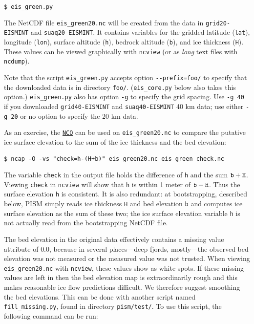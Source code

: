 \documentclass[11pt,final]{amsart}
\begin{document}
\verb|$ eis_green.py|

The NetCDF file \verb|eis_green20.nc| will be created from the data in \verb|grid20-EISMINT| and \verb|suaq20-EISMINT|.  It contains variables for the gridded latitude (\verb|lat|), longitude (\verb|lon|), surface altitude (\verb|h|), bedrock altitude (\verb|b|), and ice thickness (\verb|H|).  These values can be viewed graphically with \verb|ncview| (or as \emph{long} text files with \verb|ncdump|).

Note that the script \verb|eis_green.py| accepts option \verb|--prefix=foo/| to specify that the downloaded data is in directory \verb|foo/|.  (\verb|eis_core.py| below also takes this option.)  \verb|eis_green.py| also has option \verb|-g| to specify the grid spacing.  Use \verb|-g 40| if you downloaded \verb|grid40-EISMINT| and \verb|suaq40-EISMINT| 40 km data; use either \verb|-g 20| or no option to specify the 20 km data.

As an exercise, the \href{http://nco.sourceforge.net/}{\texttt{NCO}} can be used on \verb|eis_green20.nc| to compare the putative ice surface elevation to the sum of the ice thickness and the bed elevation:

\verb|$ ncap -O -vs "check=h-(H+b)" eis_green20.nc eis_green_check.nc|

\noindent The variable \verb|check| in the output file holds the difference of \verb|h| and the sum $\verb|b|+\verb|H|$.  Viewing \verb|check| in \verb|ncview| will show that \verb|h| is within 1 meter of $\verb|b|+\verb|H|$.  Thus the surface elevation \verb|h| is consistent.  It is also redundant: at bootstrapping, described below, PISM simply reads ice thickness \verb|H| and bed elevation \verb|b| and computes ice surface elevation as the sum of these two; the ice surface elevation variable \verb|h| is not actually read from the bootstrapping NetCDF file.

The bed elevation in the original data effectively contains a missing value attribute of $0.0$, because in several places---deep fjords, mostly---the observed bed elevation was not measured or the measured value was not trusted.  When viewing \verb|eis_green20.nc| with \verb|ncview|, these values show as white spots.  If these missing values are left in then the bed elevation map is extraordinarily rough and this makes reasonable ice flow predictions difficult.  We therefore suggest smoothing the bed elevations.  This can be done with another script named \verb|fill_missing.py|, found in directory \verb|pism/test/|. To use this script, the following command can be run:
\end{document}

